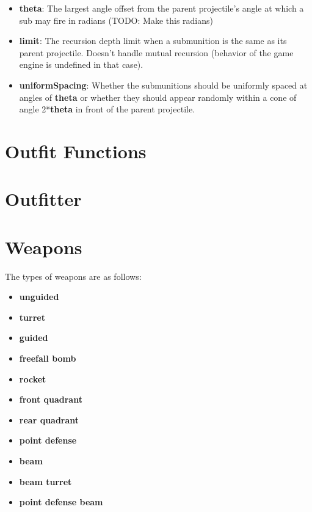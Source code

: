\documentclass{article}
\begin{document}
\begin{itemize}
\begin{itemize}
    \item{\textbf{theta}}: The largest angle offset from the parent projectile's angle at which a sub may fire in radians (TODO: Make this radians)
    \item{\textbf{limit}}: The recursion depth limit when a submunition is the same as its parent projectile. Doesn't handle mutual recursion (behavior of the game engine is undefined in that case).
    \item{\textbf{uniformSpacing}}: Whether the submunitions should be uniformly spaced at angles of \textbf{theta} or whether they should appear randomly within a cone of angle 2*\textbf{theta} in front of the parent projectile.
  \end{itemize}
\end{itemize}










\section{Outfit Functions} \label{outfit-functions}

\section{Outfitter} \label{outfitter}

\section{Weapons} \label{weapons}
The types of weapons are as follows:
\begin{itemize}
\item{\textbf{unguided}}
\item{\textbf{turret}}
\item{\textbf{guided}}
\item{\textbf{freefall bomb}}
\item{\textbf{rocket}}
\item{\textbf{front quadrant}}
\item{\textbf{rear quadrant}}
\item{\textbf{point defense}}
\item{\textbf{beam}}
\item{\textbf{beam turret}}
\item{\textbf{point defense beam}}
\end{itemize}
\end{document}
